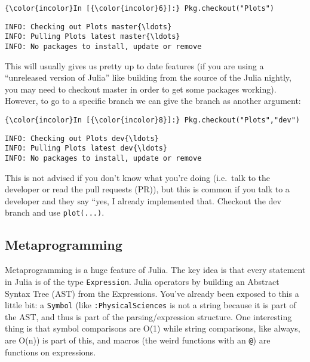 \documentclass[11pt]{article}
\begin{document}
    \begin{Verbatim}[commandchars=\\\{\}]
{\color{incolor}In [{\color{incolor}6}]:} Pkg.checkout("Plots")
\end{Verbatim}

    \begin{Verbatim}[commandchars=\\\{\}]
INFO: Checking out Plots master{\ldots}
INFO: Pulling Plots latest master{\ldots}
INFO: No packages to install, update or remove

    \end{Verbatim}

    This will usually gives us pretty up to date features (if you are using
a ``unreleased version of Julia'' like building from the source of the
Julia nightly, you may need to checkout master in order to get some
packages working). However, to go to a specific branch we can give the
branch as another argument:

    \begin{Verbatim}[commandchars=\\\{\}]
{\color{incolor}In [{\color{incolor}8}]:} Pkg.checkout("Plots","dev")
\end{Verbatim}

    \begin{Verbatim}[commandchars=\\\{\}]
INFO: Checking out Plots dev{\ldots}
INFO: Pulling Plots latest dev{\ldots}
INFO: No packages to install, update or remove

    \end{Verbatim}

    This is not advised if you don't know what you're doing (i.e.~talk to
the developer or read the pull requests (PR)), but this is common if you
talk to a developer and they say ``yes, I already implemented that.
Checkout the dev branch and use \texttt{plot(...)}.

    \subsection{Metaprogramming}\label{metaprogramming}

Metaprogramming is a huge feature of Julia. The key idea is that every
statement in Julia is of the type \texttt{Expression}. Julia operators
by building an Abstract Syntax Tree (AST) from the Expressions. You've
already been exposed to this a little bit: a \texttt{Symbol} (like
\texttt{:PhysicalSciences} is not a string because it is part of the
AST, and thus is part of the parsing/expression structure. One
interesting thing is that symbol comparisons are O(1) while string
comparisons, like always, are O(n)) is part of this, and macros (the
weird functions with an \texttt{@}) are functions on expressions.
\end{document}
